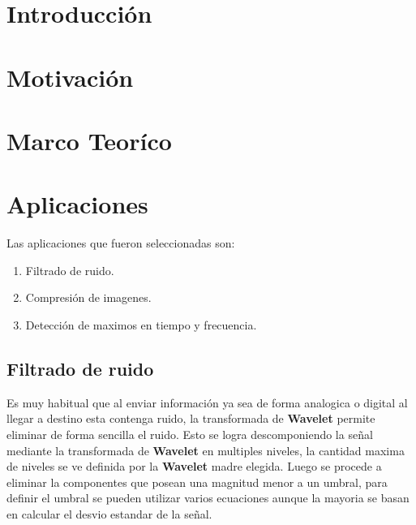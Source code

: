 \documentclass[]{IEEEtran}
\title{}
\author{}
\date{}
\newcommand{\wavelet}{\hspace{.002cm}\textbf{Wavelet}\hspace{.002cm} }
\begin{document}
    \maketitle

    \begin{abstract}

    \end{abstract}

    \section{Introducción}

    \section{Motivación}


    \section{Marco Teoríco}


    \section{Aplicaciones}

    Las aplicaciones que fueron seleccionadas son:

    \begin{enumerate}
        \item Filtrado de ruido.
        \item Compresión de imagenes.
        \item Detección de maximos en tiempo y frecuencia.
    \end{enumerate}


    \subsection{Filtrado de ruido}

    Es muy habitual que al enviar información ya sea de forma analogica o digital al llegar a destino 
    esta contenga ruido, la transformada de \wavelet permite eliminar de forma sencilla el ruido.
    Esto se logra descomponiendo la señal mediante la transformada de \wavelet en multiples niveles, 
    la cantidad maxima de niveles se ve definida por la \wavelet madre elegida. 
    Luego se procede a eliminar la componentes que posean una magnitud menor a un umbral, 
    para definir el umbral se pueden utilizar varios ecuaciones aunque la mayoria se basan 
    en calcular el desvio estandar de la señal.
\end{document}
